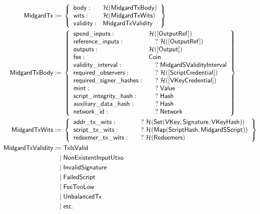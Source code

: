 \documentclass[../midgard.tex]{subfiles}
\begin{document}
\begingroup
\allowdisplaybreaks
\begin{align*}
    \mathsf{MidgardTx} \coloneq\;& \left\{
    \begin{array}{ll}
        \mathsf{body} : & \mathcal{H}(\mathsf{MidgardTxBody}) \\
        \mathsf{wits} : & \mathcal{H}(\mathsf{MidgardTxWits}) \\
        \mathsf{validity} : & \mathsf{MidgardTxValidity} \\
    \end{array} \right\} \\
    \mathsf{MidgardTxBody} \coloneq\;& \left\{
    \begin{array}{ll}
        \mathsf{spend\_inputs} : & \mathcal{H}(\mathsf{[OutputRef]}) \\
        \mathsf{reference\_inputs} : & \quad?\;\mathcal{H}(\mathsf{[OutputRef]}) \\
        \mathsf{outputs} : & \mathcal{H}(\mathsf{[Output]}) \\
        \mathsf{fee} : & \mathsf{Coin} \\
        \mathsf{validity\_interval} : & \quad?\;\mathsf{MidgardSValidityInterval} \\
        \mathsf{required\_observers} : & \quad?\;\mathcal{H}(\mathsf{[ScriptCredential]}) \\
        \mathsf{required\_signer\_hashes} : & \quad?\;\mathcal{H}(\mathsf{[VKeyCredential]}) \\
        \mathsf{mint} : & \quad?\;\mathsf{Value} \\
        \mathsf{script\_integrity\_hash} : & \quad?\;\mathsf{Hash} \\
        \mathsf{auxiliary\_data\_hash} : & \quad?\;\mathsf{Hash} \\
        \mathsf{network\_id} : & \quad?\;\mathsf{Network}
    \end{array} \right\}\\
    \mathsf{MidgardTxWits} \coloneq\;& \left\{
    \begin{array}{ll}
        \mathsf{addr\_tx\_wits} : & \quad?\;\mathcal{H}(\mathsf{Set(VKey, Signature, VKeyHash)}) \\
        \mathsf{script\_tx\_wits} : & \quad?\;\mathcal{H}(\mathsf{Map(ScriptHash, MidgardSScript)}) \\
        \mathsf{redeemer\_tx\_wits} : & \quad?\;\mathcal{H}(\mathsf{Redeemers})
    \end{array} \right\}\\
    \mathsf{MidgardTxValidity} \coloneq\;& \mathsf{TxIsValid} \\
                              \mid\;& \mathsf{NonExistentInputUtxo} \\
                              \mid\;& \mathsf{InvalidSignature} \\
                              \mid\;& \mathsf{FailedScript} \\
                              \mid\;& \mathsf{FeeTooLow} \\
                              \mid\;& \mathsf{UnbalancedTx} \\
                              \mid\;& \mathsf{etc.}
\end{align*}
\endgroup
\end{document}
